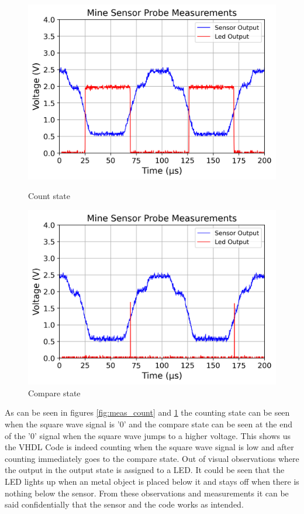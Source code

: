 \begin{figure}[!h]
    \begin{minipage}{0.5\textwidth}
     \includegraphics[width=\linewidth]{EPO 2 Images & Plots/Mine Sensor/V3_Count_Stage_No_Mine.png}
     \caption{Count state}
     \label{fig:meas_count}
    \end{minipage}
    \hfill
    \begin{minipage}{0.5\textwidth}
      \includegraphics[width=\linewidth]{EPO 2 Images & Plots/Mine Sensor/V3_Compare_State_No_Mine.png}
      \caption{Compare state}
      \label{fig:meas_compare}
    \end{minipage}
\end{figure}

As can be seen in figures \ref{fig:meas_count} and \ref{fig:meas_compare} the counting state can be seen when the square wave signal is '0' and the compare state can be seen at the end of the '0' signal when the square wave jumps to a higher voltage. This shows us the VHDL Code is indeed counting when the square wave signal is low and after counting immediately goes to the compare state. Out of visual observations where the output in the output state is assigned to a LED. It could be seen that the LED lights up when an metal object is placed below it and stays off when there is nothing below the sensor. From these observations and measurements it can be said confidentially that the sensor and the code works as intended.

